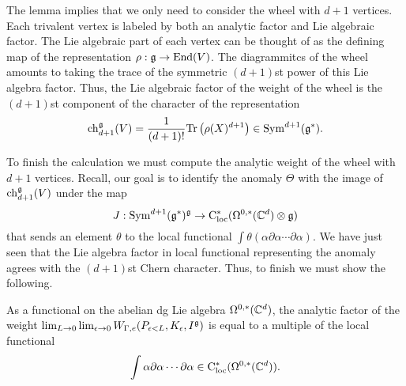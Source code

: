 \documentclass[10pt]{amsart}
\def\brian{\textcolor{blue}{BW: }\textcolor{blue}}
\begin{document}
%

The lemma implies that we only need to consider the wheel with $d+1$ vertices. 
Each trivalent vertex is labeled by both an analytic factor and Lie algebraic factor. 
The Lie algebraic part of each vertex can be thought of as the defining map of the representation $\rho : \mathfrak g \to {\rm End}(V)$. 
The diagrammitcs of the wheel amounts to taking the trace of the symmetric $(d+1)$st power of this Lie algebra factor. 
Thus, the Lie algebraic factor of the weight of the wheel is the $(d+1)$st component of the character of the representation
\[
{\rm ch}_{d+1}^\mathfrak g(V) = \frac{1}{(d+1)!} {\rm Tr}\left(\rho(X)^{d+1}\right) \in {\rm Sym}^{d+1}(\mathfrak g^*) .
\]

To finish the calculation we must compute the analytic weight of the wheel with $d+1$ vertices. 
Recall, our goal is to identify the anomaly $\Theta$ with the image of ${\rm ch}_{d+1}^\mathfrak g(V)$ under the map
\[
J : {\rm Sym}^{d+1}(\mathfrak g^*)^\mathfrak g \to {\rm C}_{\rm loc}^*(\Omega^{0,*}(\mathbb C^d)\otimes \mathfrak g)
\]
that sends an element $\theta$ to the local functional $\int \theta(\alpha \partial \alpha \cdots \partial \alpha)$. 
We have just seen that the Lie algebra factor in local functional representing the anomaly agrees with the $(d+1)$st Chern character. 
Thus, to finish we must show the following.

\begin{lem} 
As a functional on the abelian dg Lie algebra $\Omega^{0,*}(\mathbb C^d)$, the analytic factor of the weight $\lim_{L\to 0} \lim_{\epsilon \to 0} W_{\Gamma, e} (P_{\epsilon < L}, K_\epsilon, I^\mathfrak g)$ is equal to a multiple of the local functional
\[
\int \alpha \partial \alpha \cdots \partial \alpha \in {\rm C}_{\rm loc}^*(\Omega^{0,*}(\mathbb C^d)) .
\]
\end{lem}
\end{document}
